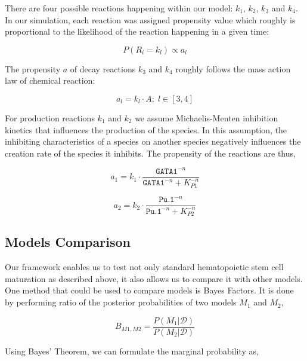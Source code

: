 \documentclass{bioinfo}
\begin{document}
There are four possible reactions happening within our model: $k_1$, $k_2$, $k_3$ and $k_4$. In our simulation, each reaction was assigned propensity value which roughly is proportional to the likelihood of the reaction happening in a given time:

\begin{equation}
P(R_i = k_l) \propto a_l\label{eq:22}
\end{equation}

The propensity $a$ of decay reactions $k_3$ and $k_4$ roughly follows the mass action law of chemical reaction:

\begin{equation}
a_l = k_l \cdot A {;} \; l \in [3, 4]\label{eq:23}
\end{equation}

For production reactions $k_1$ and $k_2$ we assume Michaelis-Menten inhibition kinetics that influences the production of the species. In this assumption, the inhibiting characteristics of a species on another species negatively influences the creation rate of the species it inhibits. The propensity of the reactions are thus,

\begin{equation}
a_1 = k_1 \cdot \frac{\texttt{GATA1}^{-n}}{\texttt{GATA1}^{-n} + K_{P1}^{-n}}\label{eq:24}
\end{equation}

\begin{equation}
a_2 = k_2 \cdot \frac{\texttt{Pu.1}^{-n}}{\texttt{Pu.1}^{-n} + K_{P2}^{-n}}\label{eq:25}
\end{equation}

\subsection{Models Comparison}

Our framework enables us to test not only standard hematopoietic stem cell maturation as described above, it also allows us to compare it with other models. One method that could be used to compare models is Bayes Factors. It is done by performing ratio of the posterior probabilities of two models $M_1$ and $M_2$,

\begin{equation}
B_{M1, M2} = \frac{P(M_1 | \mathcal{D})}{P(M_2 | \mathcal{D})}\label{eq:26}
\end{equation}

Using Bayes' Theorem, we can formulate the marginal probability as,
\end{document}
